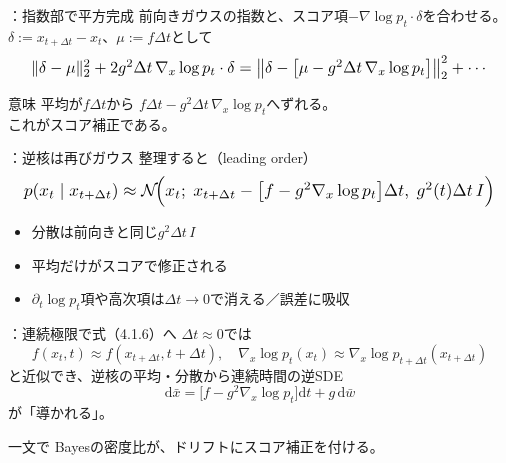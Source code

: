 \begin{frame}{\supplmark：指数部で平方完成}
    前向きガウスの指数と、スコア項$-\nabla\log p_t\cdot\delta$を合わせる。\\
    $\delta:=x_{t+\Delta t}-x_t$、$\mu:=f\Delta t$として
    \[
        \resizebox{0.95\textwidth}{!}{$
        \|\delta-\mu\|_{2}^{2}
        + 2g^{2}\Delta t\,\nabla_x\log p_t\cdot\delta
        =
        \bigl\|
            \delta
            - \bigl[\mu - g^{2}\Delta t\,\nabla_x\log p_t\bigr]
        \bigr\|_{2}^{2}
        + \cdots
        $}
    \]
    \begin{exampleblock}{意味}
        平均が$f\Delta t$から
        $f\Delta t - g^{2}\Delta t\,\nabla_x\log p_t$へずれる。\\
        これがスコア補正である。
    \end{exampleblock}
\end{frame}
\assuppl
\begin{frame}{\supplmark：逆核は再びガウス}
    整理すると（leading order）
    \[
        \resizebox{0.98\textwidth}{!}{$
        p(x_t\mid x_{t+\Delta t})
        \approx
        \mathcal{N}\!\Bigl(
            x_t;\;
            x_{t+\Delta t}
            - \bigl[f - g^{2}\nabla_x\log p_t\bigr]\Delta t,\;
            g^{2}(t)\Delta t\,I
        \Bigr)
        $}
    \]
    \begin{itemize}
        \item 分散は前向きと同じ$g^{2}\Delta t\,I$
        \item 平均だけがスコアで修正される
        \item $\partial_t\log p_t$項や高次項は$\Delta t\to 0$で消える／誤差に吸収
    \end{itemize}
\end{frame}
\assuppl
\begin{frame}{\supplmark：連続極限で式（4.1.6）へ}
    $\Delta t\approx 0$では
    \[
        f(x_t,t)\approx f(x_{t+\Delta t},t+\Delta t),\quad
        \nabla_x\log p_t(x_t)
        \approx
        \nabla_x\log p_{t+\Delta t}(x_{t+\Delta t})
    \]
    と近似でき、逆核の平均・分散から連続時間の逆SDE
    \[
        \mathrm{d}\bar{x}
        =
        \bigl[f - g^{2}\nabla_x\log p_t\bigr]\mathrm{d}t
        + g\,\mathrm{d}\bar{w}
        \tag{4.1.6}
    \]
    が「導かれる」。
    \begin{exampleblock}{一文で}
        Bayesの密度比が、ドリフトにスコア補正を付ける。
    \end{exampleblock}
\end{frame}

